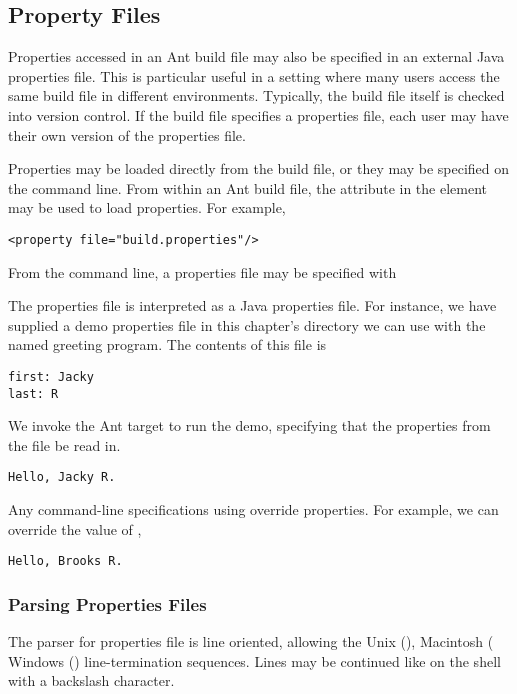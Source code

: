 \subsection{Property Files}

Properties accessed in an Ant build file may also be specified in an
external Java properties file.  This is particular useful in a setting
where many users access the same build file in different environments.
Typically, the build file itself is checked into version control.  If
the build file specifies a properties file, each user may have their
own version of the properties file.

Properties may be loaded directly from the build file, or they may be
specified on the command line.  From within an Ant build file, the
 attribute in the  element may be used to
load properties.  For example,
%
\begin{verbatim}
<property file="build.properties"/>
\end{verbatim}
%
From the command line, a properties file may be specified with
%

The properties file is interpreted as a Java properties file.  For
instance, we have supplied a demo properties file
 in this chapter's directory we can use with
the named greeting program.  The contents of this file is
%
\begin{verbatim}
first: Jacky
last: R
\end{verbatim}
%
We invoke the Ant target  to run the demo,
specifying that the properties from the file 
be read in.
%
\begin{verbatim}
Hello, Jacky R.
\end{verbatim}
%
Any command-line specifications using  override properties.
For example, we can override the value of ,
%
\begin{verbatim}
Hello, Brooks R.
\end{verbatim}

\subsubsection{Parsing Properties Files}

The parser for properties file is line oriented, allowing the Unix
(), Macintosh ( Windows
() line-termination sequences.  Lines may be continued
like on the shell with a backslash character.


